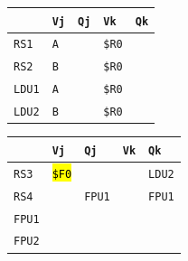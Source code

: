 \begin{enumerate}
    \begin{minipage}{0.45\textwidth}
        \centering
        \begin{tabular}{@{} l | l l l l @{}}
            \toprule
                & \texttt{Vj} & \texttt{Qj} & \texttt{Vk} & \texttt{Qk} \\
            \midrule
            \texttt{RS1} & \texttt{A} & & \texttt{\$R0} & \\ [.3em]
            \texttt{RS2} & \texttt{B} & & \texttt{\$R0} & \\
            \cmidrule{1-5}
            \texttt{LDU1} & \texttt{A} & & \texttt{\$R0} & \\ [.3em]
            \texttt{LDU2} & \texttt{B} & & \texttt{\$R0} & \\
            \bottomrule
        \end{tabular}
    \end{minipage}
    \hfill
    \begin{minipage}{0.45\textwidth}
        \centering
        \begin{tabular}{@{} l | l l l l @{}}
            \toprule
            & \texttt{Vj} & \texttt{Qj} & \texttt{Vk} & \texttt{Qk} \\
            \midrule
            \texttt{RS3} & \hl{\texttt{\$F0}} & & & \texttt{LDU2} \\ [.3em]
            \texttt{RS4} & & \texttt{FPU1} & & \texttt{FPU1} \\
            \cmidrule{1-5}
            \texttt{FPU1} & & & & \\ [.3em]
            \texttt{FPU2} & & & & \\
            \bottomrule
        \end{tabular}
    \end{minipage}


\end{enumerate}
